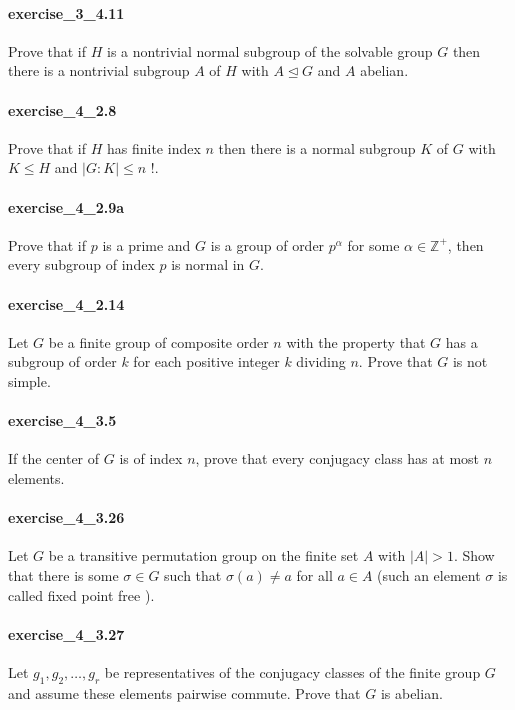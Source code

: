 \documentclass{article}
\begin{document}
\paragraph{exercise\_3\_4.11} Prove that if $H$ is a nontrivial normal subgroup of the solvable group $G$ then there is a nontrivial subgroup $A$ of $H$ with $A \unlhd G$ and $A$ abelian.

\paragraph{exercise\_4\_2.8} Prove that if $H$ has finite index $n$ then there is a normal subgroup $K$ of $G$ with $K \leq H$ and $|G: K| \leq n$ !.

\paragraph{exercise\_4\_2.9a} Prove that if $p$ is a prime and $G$ is a group of order $p^{\alpha}$ for some $\alpha \in \mathbb{Z}^{+}$, then every subgroup of index $p$ is normal in $G$.

\paragraph{exercise\_4\_2.14} Let $G$ be a finite group of composite order $n$ with the property that $G$ has a subgroup of order $k$ for each positive integer $k$ dividing $n$. Prove that $G$ is not simple.

\paragraph{exercise\_4\_3.5} If the center of $G$ is of index $n$, prove that every conjugacy class has at most $n$ elements.

\paragraph{exercise\_4\_3.26} Let $G$ be a transitive permutation group on the finite set $A$ with $|A|>1$. Show that there is some $\sigma \in G$ such that $\sigma(a) \neq a$ for all $a \in A$ (such an element $\sigma$ is called fixed point free ).

\paragraph{exercise\_4\_3.27} Let $g_{1}, g_{2}, \ldots, g_{r}$ be representatives of the conjugacy classes of the finite group $G$ and assume these elements pairwise commute. Prove that $G$ is abelian.
\end{document}
